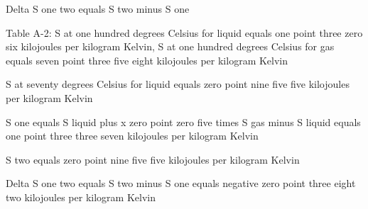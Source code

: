 Delta S one two equals S two minus S one  

Table A-2:  
S at one hundred degrees Celsius for liquid equals one point three zero six kilojoules per kilogram Kelvin, S at one hundred degrees Celsius for gas equals seven point three five eight kilojoules per kilogram Kelvin  

S at seventy degrees Celsius for liquid equals zero point nine five five kilojoules per kilogram Kelvin  

S one equals S liquid plus x zero point zero five times S gas minus S liquid equals one point three three seven kilojoules per kilogram Kelvin  

S two equals zero point nine five five kilojoules per kilogram Kelvin  

Delta S one two equals S two minus S one equals negative zero point three eight two kilojoules per kilogram Kelvin